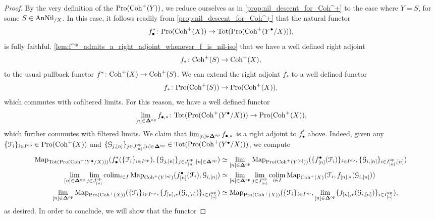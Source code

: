 \documentclass[10pt,a4paper,reqno]{amsart} %
\theoremstyle{plain}
\theoremstyle{definition}
\theoremstyle{remark}
\numberwithin{equation}{section}
\begin{document}
\begin{proof}
    By the very definition of the \infcat $\mathrm{Pro}(\mathrm{Coh}^+(Y))$, we reduce ourselves as in
    \cref{prop:nil_descent_for_Coh^+} to the case where $Y = S$, for some $S \in \mathrm{AnNil}_{/X}$. In this case, it follows readily from
    \cref{prop:nil_descent_for_Coh^+} that the natural functor
        \[
            f_\bullet^* \colon \mathrm{Pro}(\mathrm{Coh}^+(X)) \to \mathrm{Tot}(\mathrm{Pro}(\mathrm{Coh}^+(Y^\bullet/X))),  
        \]
    is fully faithful. \cref{lem:f^*_admits_a_right_adjoint_whenever_f_is_nil-iso} that we have a well defined right adjoint
        \[
            f_* \colon \mathrm{Coh}^+(S) \to \mathrm{Coh}^+(X),  
        \]
    to the usual pullback functor $f^* \colon \mathrm{Coh}^+(X) \to \mathrm{Coh}^+(S)$. We can extend the right adjoint $f_*$ to a well defined functor
        \[
            f_* \colon \mathrm{Pro}(\mathrm{Coh}^+(S)) \to \mathrm{Pro}(\mathrm{Coh}^+(X)),  
        \]
    which commutes with cofiltered limits. For this reason, we have a well defined functor
        \[
            \lim_{[n] \in \bm{\Delta} ^\mathrm{op}} f_{\bullet, *} \colon \mathrm{Tot}(\mathrm{Pro}(\mathrm{Coh}^+(Y^\bullet/X))) \to \mathrm{Pro}(\mathrm{Coh}^+(X)),  
        \]
    which further commutes with filtered limits. We claim that $\lim_{[n] \in \bm{\Delta} ^\mathrm{op}} f_{\bullet, *}$ is a right adjoint to $f_\bullet^*$ above. Indeed, given
    any $\{ \mathcal F_i \}_{i \in I^\mathrm{op}}  \in \mathrm{Pro}(\mathrm{Coh}^+(X))$ and $\{ \mathcal G_{j, [n]} \}_{j \in J_{[n]} ^\mathrm{op}, [n] \in \bm{\Delta} ^\mathrm{op}} \in \mathrm{Tot}(\mathrm{Pro}(\mathrm{Coh}^+(Y^\bullet/X)))$,
    we compute
        \begin{align*}
            \operatorname{Map}_{\mathrm{Tot}(\mathrm{Pro}(\mathrm{Coh}^+(Y^\bullet/X)))}( f_\bullet^*( \{ \mathcal F_i \}_{i \in I^\mathrm{op}}), \{ \mathcal G_{j, [n]} \}_{j \in J^\mathrm{op}_{[n]}, [n] \in \bm{\Delta} ^\mathrm{op}}) & \simeq \lim_{[n] \in \bm{\Delta} ^\mathrm{op}} \operatorname{Map}_{\mathrm{Pro}(\mathrm{Coh}^+(Y^{[n]}))} ( \{f_{[n]}^\bullet(\mathcal F_i) \}_{i \in I^\mathrm{op}},  \{ \mathcal G_{i, [n]} \}_{i \in I^\mathrm{op}_{[n]}, [n]}) \\
            \lim_{[n] \in \bm{\Delta} ^\mathrm{op}} \lim_{j \in J^\mathrm{op}_{[n]}} \mathrm{colim}_{i \in I} \operatorname{Map}_{\mathrm{Coh}^+(Y^{[n]})} ( f_{[n]}^\bullet(\mathcal F_i),   \mathcal G_{i, [n]}) & \simeq \lim_{[n] \in \bm{\Delta} ^\mathrm{op}} \lim_{j \in J^\mathrm{op}_{[n]}} \operatorname*{colim}_{i \in I} \operatorname{Map}_{\mathrm{Coh}^+(X)} (\mathcal F_i, f_{[n], *}(\mathcal G_{i, [n]})) \\
            \lim_{[n] \in \bm{\Delta} ^\mathrm{op}} \operatorname{Map}_{\mathrm{Pro}(\mathrm{Coh}^+(X))}( \{\mathcal F_i\}_{i \in I^\mathrm{op}}, \{f_{[n], *}(\mathcal G_{i, [n]}) \}_{i \in I_{[n]} ^\mathrm{op}}) & \simeq \operatorname{Map}_{\mathrm{Pro}(\mathrm{Coh}^+(X))}( \{\mathcal F_i\}_{i \in I^\mathrm{op}}, \lim_{[n] \in \bm{\Delta} ^\mathrm{op}} \{f_{[n], *}(\mathcal G_{i, [n]}) \}_{i \in I_{[n]} ^\mathrm{op}}),
        \end{align*}
    as desired. In order to conclude, we will show that the functor

\end{proof}
\end{document}
